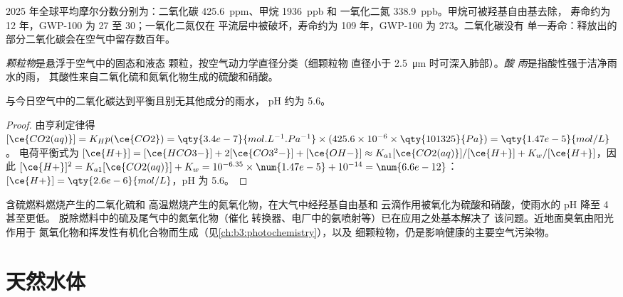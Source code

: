 2025 年全球平均摩尔分数分别为：二氧化碳 \qty{425.6}{ppm}、甲烷 \qty{1936}{ppb} 和
一氧化二氮 \qty{338.9}{ppb}。甲烷可被羟基自由基去除，
寿命约为 12 年，GWP-100 为 27 至 30；一氧化二氮仅在
平流层中被破坏，寿命约为 109 年，GWP-100 为 273。二氧化碳没有
单一寿命：释放出的部分二氧化碳会在空气中留存数百年。

\begin{definition}[空气污染物]\label{def:b3:environmental-toxicology:pollutants}
\emph{颗粒物}是悬浮于空气中的固态和液态
颗粒，按空气动力学直径分类（细颗粒物
直径小于 \qty{2.5}{\micro\metre} 时可深入肺部）。\emph{酸
雨}是指酸性强于洁净雨水的雨，
其酸性来自二氧化硫和氮氧化物生成的硫酸和硝酸。
\end{definition}

\begin{proposition}[洁净雨水的 pH]\label{prop:b3:environmental-toxicology:rain-ph}
与今日空气中的二氧化碳达到平衡且别无其他成分的雨水，
pH 约为 5.6。
\end{proposition}

\begin{proof}
由亨利定律得 $[\ce{CO2(aq)}] = K_Hp(\ce{CO2}) = \qty{3.4e-7}{mol.L^{-1}.Pa^{-1}} \times (425.6 \times 10^{-6} \times \qty{101325}{Pa}) = \qty{1.47e-5}{mol/L}$。
电荷平衡式为 $[\ce{H+}] = [\ce{HCO3-}] + 2[\ce{CO3^2-}] + [\ce{OH-}] \approx K_{a1}[\ce{CO2(aq)}]/[\ce{H+}] + K_w/[\ce{H+}]$，因此
$[\ce{H+}]^2 = K_{a1}[\ce{CO2(aq)}] + K_w = 10^{-6.35} \times \num{1.47e-5} + 10^{-14} = \num{6.6e-12}$：$[\ce{H+}] = \qty{2.6e-6}{mol/L}$，pH 为 5.6。
\end{proof}

含硫燃料燃烧产生的二氧化硫和
高温燃烧产生的氮氧化物，在大气中经羟基自由基和
云滴作用被氧化为硫酸和硝酸，使雨水的 pH 降至 4 甚至更低。
脱除燃料中的硫及尾气中的氮氧化物（催化
转换器、电厂中的氨喷射等）已在应用之处基本解决了
该问题。近地面臭氧由阳光作用于
氮氧化物和挥发性有机化合物而生成（见\cref{ch:b3:photochemistry}），以及
细颗粒物，仍是影响健康的主要空气污染物。

\section{天然水体}

